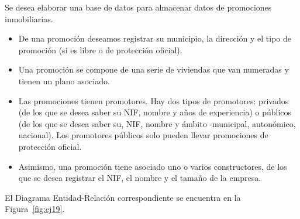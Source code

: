 \begin{ejercicio} \label{ej:19}
    Se desea elaborar una base de datos para almacenar datos de promociones inmobiliarias.
    \begin{itemize}
        \item De una promoción deseamos registrar su municipio, la dirección y el tipo de promoción (si es libre o
        de protección oficial).
        \item Una promoción se compone de una serie de viviendas que van numeradas y tienen un plano asociado.
        \item Las promociones tienen promotores. Hay dos tipos de promotores: privados (de los que se desea saber
        su NIF, nombre y años de experiencia) o públicos (de los que se desea saber su, NIF, nombre y ámbito
        -municipal, autonómico, nacional). Los promotores públicos solo pueden llevar promociones de
        protección oficial.
        \item Asimismo, una promoción tiene asociado uno o varios constructores, de los que se desea registrar el
        NIF, el nombre y el tamaño de la empresa.
    \end{itemize}

    El Diagrama Entidad-Relación correspondiente se encuentra en la Figura~\ref{fig:ej19}.
    \begin{figure}
        \centering
\end{figure}
\end{ejercicio}
